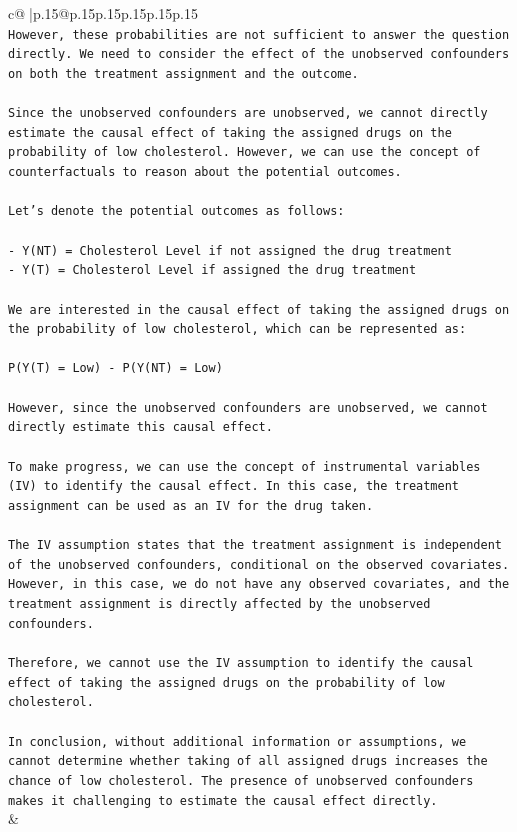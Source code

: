 \documentclass{article}
\begin{document}
{\begin{supertabular}{c@{$\;$}|p{.15\linewidth}@{}p{.15\linewidth}p{.15\linewidth}p{.15\linewidth}p{.15\linewidth}p{.15\linewidth}}
{{{\\ 
\texttt{However, these probabilities are not sufficient to answer the question directly. We need to consider the effect of the unobserved confounders on both the treatment assignment and the outcome.} \\
\\ 
\texttt{Since the unobserved confounders are unobserved, we cannot directly estimate the causal effect of taking the assigned drugs on the probability of low cholesterol. However, we can use the concept of counterfactuals to reason about the potential outcomes.} \\
\\ 
\texttt{Let's denote the potential outcomes as follows:} \\
\\ 
\texttt{{-} Y(NT) = Cholesterol Level if not assigned the drug treatment} \\
\texttt{{-} Y(T) = Cholesterol Level if assigned the drug treatment} \\
\\ 
\texttt{We are interested in the causal effect of taking the assigned drugs on the probability of low cholesterol, which can be represented as:} \\
\\ 
\texttt{P(Y(T) = Low) {-} P(Y(NT) = Low)} \\
\\ 
\texttt{However, since the unobserved confounders are unobserved, we cannot directly estimate this causal effect.} \\
\\ 
\texttt{To make progress, we can use the concept of instrumental variables (IV) to identify the causal effect. In this case, the treatment assignment can be used as an IV for the drug taken.} \\
\\ 
\texttt{The IV assumption states that the treatment assignment is independent of the unobserved confounders, conditional on the observed covariates. However, in this case, we do not have any observed covariates, and the treatment assignment is directly affected by the unobserved confounders.} \\
\\ 
\texttt{Therefore, we cannot use the IV assumption to identify the causal effect of taking the assigned drugs on the probability of low cholesterol.} \\
\\ 
\texttt{In conclusion, without additional information or assumptions, we cannot determine whether taking of all assigned drugs increases the chance of low cholesterol. The presence of unobserved confounders makes it challenging to estimate the causal effect directly.} \\
            }
        }
    }
    & \\ \\


\end{supertabular}}
\end{document}

